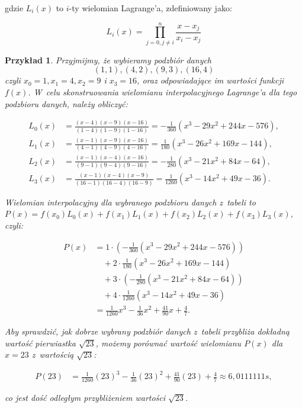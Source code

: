 \documentclass[12pt]{article}
\newtheorem{example}{Przykład}
\begin{document}
gdzie $L_i(x)$ to $i$-ty wielomian Lagrange'a, zdefiniowany jako:

\begin{equation*}
L_i(x) = \prod_{j=0, j\neq i}^{n} \frac{x-x_j}{x_i-x_j}
\end{equation*}

\begin{example}

Przyjmijmy, że wybieramy podzbiór danych $${(1,1), (4,2), (9,3), (16,4)}$$ czyli $x_0=1, x_1=4, x_2=9$ i $x_3=16$, oraz odpowiadające im wartości funkcji $f(x)$. W~celu skonstruowania wielomianu interpolacyjnego Lagrange'a dla tego podzbioru danych, należy obliczyć:

\begin{align*}
L_0(x) &= \frac{(x-4)(x-9)(x-16)}{(1-4)(1-9)(1-16)} = -\frac{1}{360}(x^3 - 29x^2 + 244x - 576), \\
L_1(x) &= \frac{(x-1)(x-9)(x-16)}{(4-1)(4-9)(4-16)} = \frac{1}{180}(x^3 - 26x^2 + 169x - 144), \\
L_2(x) &= \frac{(x-1)(x-4)(x-16)}{(9-1)(9-4)(9-16)} = -\frac{1}{280}(x^3 - 21x^2 + 84x - 64), \\
L_3(x) &= \frac{(x-1)(x-4)(x-9)}{(16-1)(16-4)(16-9)} = \frac{1}{1260}(x^3 - 14x^2 + 49x - 36).
\end{align*}

Wielomian interpolacyjny dla wybranego podzbioru danych z~tabeli to \\ $P(x) = f(x_0)L_0(x) + f(x_1)L_1(x) + f(x_2)L_2(x) + f(x_3)L_3(x)$, czyli:

\begin{align*}
P(x) &= 1\cdot\left(-\frac{1}{360}(x^3 - 29x^2 + 244x - 576)\right) \\
&\quad + 2\cdot\frac{1}{180}(x^3 - 26x^2 + 169x - 144) \\
&\quad + 3\cdot\left(-\frac{1}{280}(x^3 - 21x^2 + 84x - 64)\right) \\
&\quad + 4\cdot\frac{1}{1260}(x^3 - 14x^2 + 49x - 36) \\
&= \frac{1}{1260}x^3 - \frac{1}{36}x^2 + \frac{41}{90}x + \frac{4}{7}.
\end{align*}

Aby sprawdzić, jak dobrze wybrany podzbiór danych z~tabeli przybliża dokładną wartość pierwiastka $\sqrt{23}$, możemy porównać wartość wielomianu $P(x)$ dla $x=23$ z~wartością $\sqrt{23}$:

\begin{align*}
P(23) &= \frac{1}{1260}(23)^3 - \frac{1}{36}(23)^2 + \frac{41}{90}(23) + \frac{4}{7} \approx 6,0111111s,
\end{align*}

co jest dość odległym przybliżeniem wartości $\sqrt{23}$.

\end{example}
\end{document}
